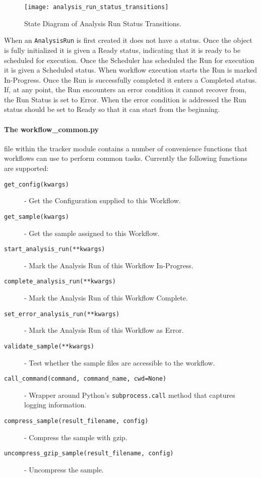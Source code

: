 \begin{figure}[H]
\texttt{[image: analysis\_run\_status\_transitions]}
\centering
\caption {State Diagram of Analysis Run Status Transitions.}
\label{fig:analysis_run_status_transitions}
\end{figure}

When an \texttt{AnalysisRun} is first created it does not have a status. Once the object is fully initialized it is given a Ready status, indicating that it is ready to be scheduled for execution. Once the Scheduler has scheduled the Run for execution it is given a Scheduled status. When workflow execution starts the Run is marked In-Progress. Once the Run is successfully completed it enters a Completed status. If, at any point, the Run encounters an error condition it cannot recover from, the Run Status is set to Error. When the error condition is addressed the Run status should be set to Ready so that it can start from the beginning.

\paragraph{The workflow\_common.py} file within the tracker module contains a number of convenience functions that workflows can use to perform common tasks. Currently the following functions are supported:

\begin{description}
\item [\texttt{get_config(kwargs)}] - Get the Configuration supplied to this Workflow.
\item [\texttt{get_sample(kwargs)}] - Get the sample assigned to this Workflow.
\item [\texttt{start_analysis_run(**kwargs)}] - Mark the Analysis Run of this Workflow In-Progress.
\item [\texttt{complete_analysis_run(**kwargs)}] - Mark the Analysis Run of this Workflow Complete. 
\item [\texttt{set_error_analysis_run(**kwargs)}] - Mark the Analysis Run of this Workflow as Error.
\item [\texttt{validate_sample(**kwargs)}] - Test whether the sample files are accessible to the workflow.
\item [\texttt{call_command(command, command_name, cwd=None)}] - Wrapper around Python's \texttt{subprocess.call} method that captures logging information.
\item [\texttt{compress_sample(result_filename, config)}] - Compress the sample with gzip.
\item [\texttt{uncompress_gzip_sample(result_filename, config)}] - Uncompress the sample.
\end{description}


